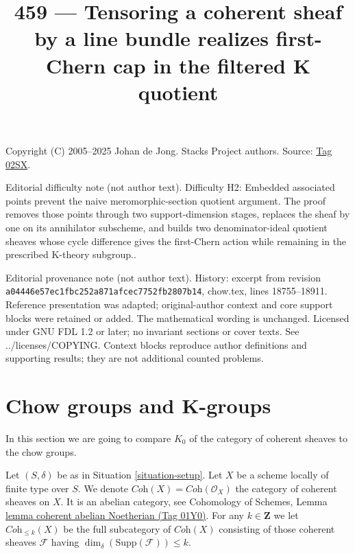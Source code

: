 \documentclass{amsart}
\theoremstyle{plain}
\theoremstyle{definition}
\theoremstyle{remark}
\numberwithin{equation}{subsection}
\begin{document}
\title[Stacks Project, Tag 02SX]{459 --- Tensoring a coherent sheaf by a line bundle realizes first-Chern cap in the filtered K quotient}
\maketitle
\noindent Copyright (C) 2005--2025 Johan de Jong. Stacks Project authors. Source: \href{https://stacks.math.columbia.edu/tag/02SX}{Tag 02SX}.

\noindent Editorial difficulty note (not author text). Difficulty H2: Embedded associated points prevent the naive meromorphic-section quotient argument. The proof removes those points through two support-dimension stages, replaces the sheaf by one on its annihilator subscheme, and builds two denominator-ideal quotient sheaves whose cycle difference gives the first-Chern action while remaining in the prescribed K-theory subgroup..

\noindent Editorial provenance note (not author text). History: excerpt from revision \texttt{a0444\allowbreak 6e57e\allowbreak c1fbc\allowbreak 252a8\allowbreak 71afc\allowbreak ec775\allowbreak 2fb28\allowbreak 07b14}, chow.tex, lines 18755--18911. Reference presentation was adapted; original-author context and core support blocks were retained or added. The mathematical wording is unchanged. Licensed under GNU FDL 1.2 or later; no invariant sections or cover texts. See ../licenses/COPYING. Context blocks reproduce author definitions and supporting results; they are not additional counted problems.

\section{Chow groups and K-groups}
\label{section-chow-and-K}

\noindent
In this section we are going to compare $K_0$ of the
category of coherent sheaves to the chow groups.

\medskip\noindent
Let $(S, \delta)$ be as in Situation \ref{situation-setup}.
Let $X$ be a scheme locally of finite type over $S$.
We denote $\textit{Coh}(X) = \textit{Coh}(\mathcal{O}_X)$
the category of coherent sheaves on $X$.
It is an abelian category, see
Cohomology of Schemes, Lemma \href{https://stacks.math.columbia.edu/tag/01Y0}{lemma coherent abelian Noetherian (Tag 01Y0)}.
For any $k \in \mathbf{Z}$ we let $\textit{Coh}_{\leq k}(X)$
be the full subcategory of $\textit{Coh}(X)$
consisting of those coherent sheaves $\mathcal{F}$
having $\dim_\delta(\text{Supp}(\mathcal{F})) \leq k$.
\end{document}
